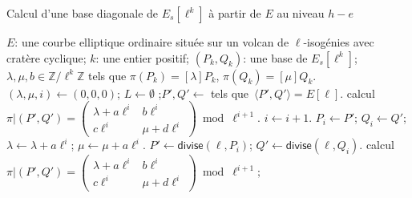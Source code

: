 \documentclass[10pt,a4paper]{book}
\theoremstyle{plain}
\theoremstyle{definition}
\theoremstyle{definition}
\theoremstyle{definition}
\theoremstyle{definition}
\theoremstyle{definition}
\theoremstyle{remark}
\theoremstyle{remark}
\theoremstyle{definition}
\begin{document}
\begin{algorithm}
\caption{\label{alg:ulti:fro}Calcul d'une base diagonale de $E_s[\ell^k]$ à partir de $E$ au niveau $h-e$}
\begin{algorithmic}[1]
\REQUIRE $E$: une courbe elliptique ordinaire située sur un volcan de $\ell$-isogénies avec cratère cyclique;
$k$: une entier positif;
\ENSURE $(P_k, Q_k )$: une base de $E_s[\ell^k]$;
$\lambda, \mu, b \in \mathbb{Z}/\ell^k \mathbb{Z}$
tels que $\pi(P_k)= [\lambda] P_k$, $ \pi(Q_k)= [\mu] Q_k$.
\STATE$(\lambda, \mu, i) \leftarrow (0,0,0)$; $L \leftarrow \emptyset $ ;$P', Q' \leftarrow $ tels que~$\langle P',Q' \rangle =  E[\ell]$. %
\STATE calcul $\pi|(P',Q')=\left( \begin{smallmatrix}
\lambda + a\ell^{i} & b\ell^{i}\\
c\ell^{i} & \mu + d\ell^{i} \end{smallmatrix} \right) \bmod {\ell^{i+1}}.$
 \label{alg:ult:scalaire:debut} %
\STATE $i \leftarrow i+1$. %
\STATE $P_i \leftarrow P'$; $Q_i \leftarrow Q'$; $\lambda \leftarrow \lambda+a \ell^i$; $\mu \leftarrow \mu +a \ell^i$.
\STATE\label{alg:ult:identical:divide}
  $P' \leftarrow \mathsf{divise}(\ell, P_{i})$; $Q' \leftarrow \mathsf{divise} (\ell, Q_{i})$.
\STATE calcul $\pi|(P',Q')=\left( \begin{smallmatrix}
\lambda + a\ell^{i} & b\ell^{i}\\
c\ell^{i} & \mu + d\ell^{i} \end{smallmatrix} \right) \bmod {\ell^{i+1}}; $%
\ENDWHILE \label{alg:ult:scalaire:fin}

\end{algorithmic}
\end{algorithm}
\end{document}

